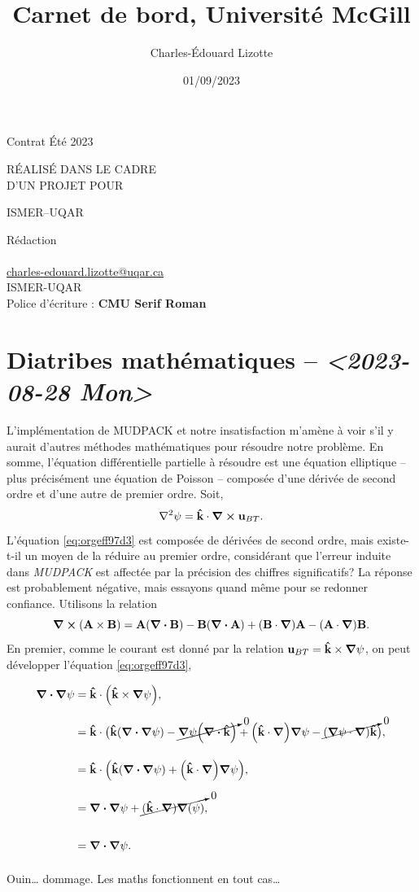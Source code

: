 \documentclass[10pt]{report}
\author{Charles-Édouard Lizotte}
\date{01/09/2023}
\title{Carnet de bord, Université McGill}
\makeatletter
\numberwithin{equation}{section}
\newcommand{\kvf}{\vb{\hat{k}}}
\newcommand{\uu}{\vb{u}}
\newcommand{\venti}{\vphantom{\sum_x^x}}
\newcommand{\mytitlepage}{
\begin{titlepage}
\begin{center}
{\Huge Contrat Été 2023 \par}
\vspace{2cm}
{\Huge \MakeUppercase{\thetitle} \par}
\vspace{2cm}
RÉALISÉ DANS LE CADRE\\ D'UN PROJET POUR \par
\vspace{2cm}
{\Huge ISMER--UQAR \par}
\vspace{2cm}
{\thedate}
\end{center}
\vfill
Rédaction \\
{\theauthor}\\
\url{charles-edouard.lizotte@uqar.ca}\\
ISMER-UQAR\\
Police d'écriture : \textbf{CMU Serif Roman}
\end{titlepage}
}
\makeatother
\begin{document}
\mytitlepage
\tableofcontents\newpage

\section{Diatribes mathématiques -- \textit{<2023-08-28 Mon>}}
\label{sec:orgcd0d13c}
L'implémentation de MUDPACK et notre insatisfaction m'amène à voir s'il y aurait d'autres méthodes mathématiques pour résoudre notre problème.
En somme, l'équation différentielle partielle à résoudre est une équation elliptique -- plus précisément une équation de Poisson -- composée d'une dérivée de second ordre et d'une autre de premier ordre.
Soit,
\begin{equation}
\label{eq:orgeff97d3}
   \laplacian{\psi} = \kvf \cdot \curl{\uu_{BT}}.
\end{equation}
L'équation \ref{eq:orgeff97d3} est composée de dérivées de second ordre, mais existe-t-il un moyen de la réduire au premier ordre, considérant que l'erreur induite dans \emph{MUDPACK} est affectée par la précision des chiffres significatifs?
La réponse est probablement négative, mais essayons quand même pour se redonner confiance.
Utilisons la relation
\begin{equation}
   \curl(\vb{A}\times\vb{B}) = \vb{A}\qty(\divergence{\vb{B}}) - \vb{B}\qty(\divergence{\vb{A}}) +\qty(\vb{B}\cdot\gradient)\vb{A} -\qty(\vb{A}\cdot\gradient)\vb{B}.
\end{equation}
En premier, comme le courant est donné par la relation \(\uu_{BT} = \kvf \times \gradient{\psi}\), on peut développer l'équation \ref{eq:orgeff97d3},
\begin{align}
   \div{\gradient{\psi}}
   \venti&= \kvf \cdot \qty(\kvf \times \gradient{\psi}),\nonumber \\
   \venti&= \kvf \cdot \big(\kvf\qty(\divergence{\gradient{\psi}}) - \cancelto{0}{\gradient{\psi}\qty(\divergence{\kvf})} + \qty(\kvf\cdot\gradient) \gradient{\psi} - \cancelto{0}{\qty(\gradient{\psi} \cdot\gradient)\kvf} \big),\nonumber\\
   \venti&= \kvf \cdot \qty(\kvf\qty(\divergence{\gradient{\psi}}) + \qty(\kvf\cdot\gradient) \gradient{\psi}),\nonumber\\
   \venti&= \divergence{\gradient{\psi}} + \cancelto{0}{(\kvf\cdot\gradient)\gradient(\psi)},\nonumber\\
   \venti&=\divergence{\gradient{\psi}}.
\end{align}
Ouin\ldots{} dommage. Les maths fonctionnent en tout cas\ldots{}
\end{document}

